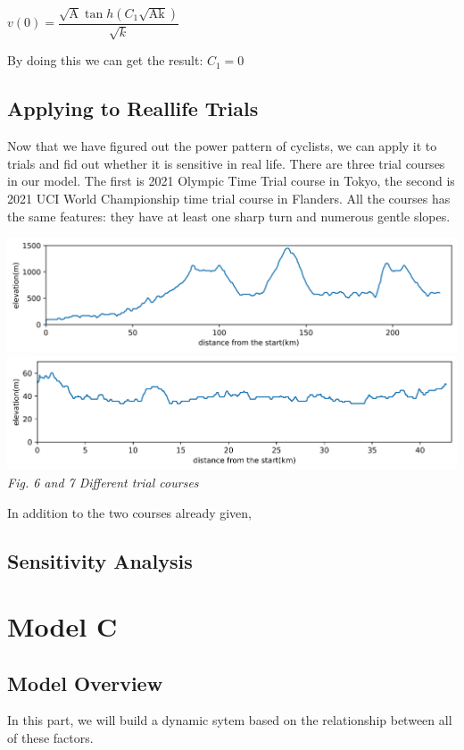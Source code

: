 \documentclass{article}
\begin{document}
		\begin{footnotesize}

		\end{footnotesize}

		$v(0)=\dfrac{\sqrt{\mathrm{A}} \tan h \left( C _1\sqrt{\mathrm{Ak}}\right)}{\sqrt{ k }}$

		By doing this we can get the result: $ C _1=0$
		\subsection{Applying to Reallife Trials}
		Now that we have figured out the power pattern of cyclists, we can apply it to trials and fid out whether it is sensitive in real life. There are three trial courses in our model. The first is 2021 Olympic Time Trial course in Tokyo, the second is 2021 UCI World Championship time trial course in Flanders. All the courses has the same features: they have at least one sharp turn and numerous gentle slopes.

		\begin{center}
			\includegraphics[width=15cm]{6.png}\\
			\includegraphics[width=15cm]{7.png}\\
			\small \textit{Fig. 6 and 7  Different trial courses}
		\end{center}
		In addition to the two courses already given,
		\subsection{Sensitivity Analysis}
	\section{Model C}
		\subsection{Model Overview}
			In this part, we will build a dynamic sytem based on the relationship between all of these factors.
\end{document}
